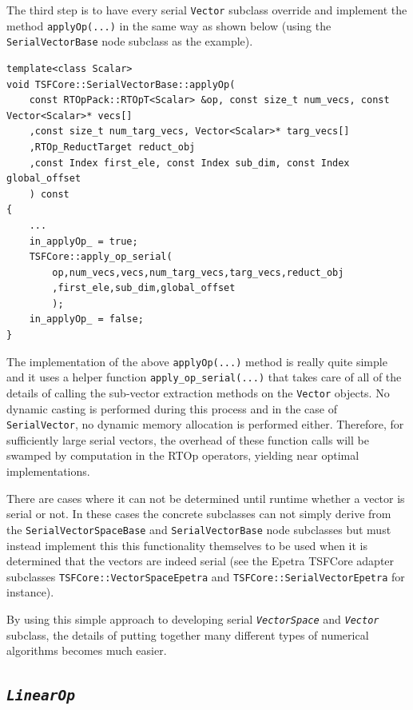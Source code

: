 The third step is to have every serial \texttt{Vector} subclass
override and implement the method \texttt{applyOp(\-...)} in the
same way as shown below (using the \texttt{SerialVectorBase} node
subclass as the example).

{\tiny\begin{verbatim}
template<class Scalar>
void TSFCore::SerialVectorBase::applyOp(
    const RTOpPack::RTOpT<Scalar> &op, const size_t num_vecs, const Vector<Scalar>* vecs[]
    ,const size_t num_targ_vecs, Vector<Scalar>* targ_vecs[]
    ,RTOp_ReductTarget reduct_obj
    ,const Index first_ele, const Index sub_dim, const Index global_offset
    ) const
{
    ...
    in_applyOp_ = true;
    TSFCore::apply_op_serial(
        op,num_vecs,vecs,num_targ_vecs,targ_vecs,reduct_obj
        ,first_ele,sub_dim,global_offset
        );
    in_applyOp_ = false;
}
\end{verbatim}}

The implementation of the above \texttt{applyOp(\-...)} method is really
quite simple and it uses a helper function
\texttt{apply\_op\_serial(...)}  that takes care of all of the details
of calling the sub-vector extraction methods on the \texttt{Vector}
objects.  No dynamic casting is performed during this process and in
the case of \texttt{SerialVector}, no dynamic memory allocation is
performed either.  Therefore, for sufficiently large serial vectors,
the overhead of these function calls will be swamped by computation in
the RTOp operators, yielding near optimal implementations.

There are cases where it can not be determined until runtime whether a
vector is serial or not.  In these cases the concrete subclasses can
not simply derive from the \texttt{Serial\-VectorSpace\-Base} and
\texttt{SerialVectorBase} node subclasses but must instead implement
this this functionality themselves to be used when it is determined
that the vectors are indeed serial (see the Epetra TSFCore adapter
subclasses \texttt{TSFCore::VectorSpaceEpetra} and
\texttt{TSFCore::SerialVectorEpetra} for instance).

By using this simple approach to developing serial
\texttt{\textit{VectorSpace}} and \texttt{\textit{Vector}} subclass,
the details of putting together many different types of numerical
algorithms becomes much easier.

%
\subsection{\texttt{\textit{LinearOp}}}
\label{tsfcore:sec:linear_op}
%

